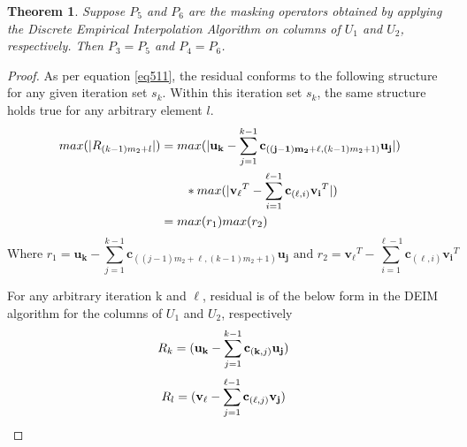 \documentclass[10pt,a4paper]{amsart}
\newtheorem{theorem}{Theorem}
\begin{document}
\begin{theorem}\label{lem63}
Suppose $P_5$ and $P_6$ are the masking operators obtained by applying the Discrete Empirical Interpolation Algorithm on columns of $U_1$ and $U_2$, respectively. Then $P_3=P_5$ and $P_4=P_6$.
\end{theorem}

\begin{proof}
    As per equation \eqref{eq511},  the residual conforms to the following structure for any given iteration set $s_k$. Within this iteration set $s_k$, the same structure holds true for any arbitrary element $l$.
\begin{equation*}
     \begin{split}
        max(\lvert R_{(k-1)m_2+l} \rvert)&=max(\lvert \bold{u_k}-\sum_{j=1}^{k-1}\bold{c}_{\bold{((j-1)m_2+\ell},(k-1)m_2+1)}\bold{u_j} \rvert)\\
        & \quad \quad *max(\lvert\bold{v_\ell}^T-\sum_{i=1}^{\ell-1}\bold{c}_{(\bold{\ell},i)}\bold{v_i}^T \rvert)\\
                            &= max(r_1)max(r_2)
     \end{split}
 \end{equation*}
\begin{equation*}
\text{Where } r_1 = \mathbf{u_k} - \sum_{j=1}^{k-1} \mathbf{c}_{\left( (j-1)m_2 + \ell , (k-1)m_2 + 1 \right)} \mathbf{u_j} 
\text{ and } r_2 = \mathbf{v_\ell}^T - \sum_{i=1}^{\ell-1} \mathbf{c}_{(\ell, i)} \mathbf{v_i}^T
\end{equation*}


For any arbitrary iteration k and $\ell$, residual is of the below form in the DEIM algorithm for the columns of $U_1$ and $U_2$, respectively 
  \begin{equation*}
     \begin{split}
         R_{k}&=(\bold{u_k}-\sum_{j=1}^{k-1}\bold{c}_{(\bold{k},j)}\bold{u_j})
     \end{split}
 \end{equation*}
 \begin{equation*}
     \begin{split}
         R_{l}&=(\bold{v_\ell}-\sum_{j=1}^{\ell-1}\bold{c}_{(\bold{\ell},j)}\bold{v_j})
     \end{split}
 \end{equation*}
\end{proof}
\end{document}
